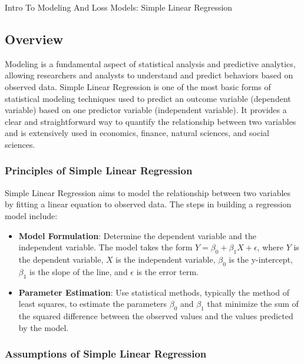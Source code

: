 \begin{notes}{Intro To Modeling And Loss Models: Simple Linear Regression}
    \subsection*{Overview}

    Modeling is a fundamental aspect of statistical analysis and predictive analytics, allowing researchers and analysts to understand and predict behaviors based on observed data. Simple Linear 
    Regression is one of the most basic forms of statistical modeling techniques used to predict an outcome variable (dependent variable) based on one predictor variable (independent variable). It 
    provides a clear and straightforward way to quantify the relationship between two variables and is extensively used in economics, finance, natural sciences, and social sciences. \vspace*{1em}
    
    \subsubsection*{Principles of Simple Linear Regression}
    
    Simple Linear Regression aims to model the relationship between two variables by fitting a linear equation to observed data. The steps in building a regression model include:
    \begin{itemize}
        \item \textbf{Model Formulation}: Determine the dependent variable and the independent variable. The model takes the form $Y = \beta_0 + \beta_1X + \epsilon$, where $Y$ is the dependent 
        variable, $X$ is the independent variable, $\beta_0$ is the y-intercept, $\beta_1$ is the slope of the line, and $\epsilon$ is the error term.
        \item \textbf{Parameter Estimation}: Use statistical methods, typically the method of least squares, to estimate the parameters $\beta_0$ and $\beta_1$ that minimize the sum of the squared 
        difference between the observed values and the values predicted by the model.
    \end{itemize}
    
    \subsubsection*{Assumptions of Simple Linear Regression}
    

\end{notes}
